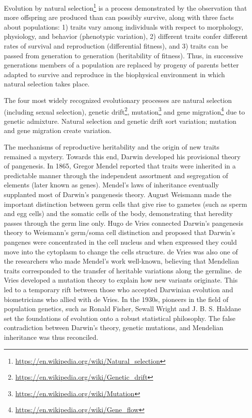 \documentclass[]{book}
\let\rmarkdownfootnote\footnote%
\def\footnote{\protect\rmarkdownfootnote}
\renewcommand{\href}[2]{#2\footnote{\url{#1}}}
\theoremstyle{definition}
\theoremstyle{definition}
\theoremstyle{definition}
\theoremstyle{remark}
\begin{document}
Evolution by
\href{https://en.wikipedia.org/wiki/Natural_selection}{natural
selection} is a process demonstrated by the observation that more
offspring are produced than can possibly survive, along with three facts
about populations: 1) traits vary among individuals with respect to
morphology, physiology, and behavior (phenotypic variation), 2)
different traits confer different rates of survival and reproduction
(differential fitness), and 3) traits can be passed from generation to
generation (heritability of fitness). Thus, in successive generations
members of a population are replaced by progeny of parents better
adapted to survive and reproduce in the biophysical environment in which
natural selection takes place.

The four most widely recognized evolutionary processes are natural
selection (including sexual selection),
\href{https://en.wikipedia.org/wiki/Genetic_drift}{genetic drift},
\href{https://en.wikipedia.org/wiki/Mutation}{mutation} and
\href{https://en.wikipedia.org/wiki/Gene_flow}{gene migration} due to
genetic admixture. Natural selection and genetic drift sort variation;
mutation and gene migration create variation.

The mechanisms of reproductive heritability and the origin of new traits
remained a mystery. Towards this end, Darwin developed his provisional
theory of pangenesis. In 1865, Gregor Mendel reported that traits were
inherited in a predictable manner through the independent assortment and
segregation of elements (later known as genes). Mendel's laws of
inheritance eventually supplanted most of Darwin's pangenesis theory.
August Weismann made the important distinction between germ cells that
give rise to gametes (such as sperm and egg cells) and the somatic cells
of the body, demonstrating that heredity passes through the germ line
only. Hugo de Vries connected Darwin's pangenesis theory to Weismann's
germ/soma cell distinction and proposed that Darwin's pangenes were
concentrated in the cell nucleus and when expressed they could move into
the cytoplasm to change the cells structure. de Vries was also one of
the researchers who made Mendel's work well-known, believing that
Mendelian traits corresponded to the transfer of heritable variations
along the germline. de Vries developed a mutation theory to explain how
new variants originate. This led to a temporary rift between those who
accepted Darwinian evolution and biometricians who allied with de Vries.
In the 1930s, pioneers in the field of population genetics, such as
Ronald Fisher, Sewall Wright and J. B. S. Haldane set the foundations of
evolution onto a robust statistical philosophy. The false contradiction
between Darwin's theory, genetic mutations, and Mendelian inheritance
was thus reconciled.
\end{document}
